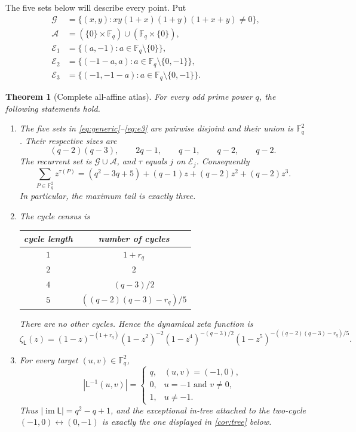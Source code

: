 \documentclass[10pt,a4paper]{amsart}
\newtheorem{theorem}{Theorem}[section]
\theoremstyle{definition}
\theoremstyle{remark}
\newcommand{\F}{\mathbb F}
\newcommand{\G}{\mathcal G}
\newcommand{\A}{\mathcal A}
\newcommand{\E}{\mathcal E}
\newcommand{\Lyn}{\mathsf L}
\newcommand{\im}{\operatorname{im}}
\begin{document}
The five sets below will describe every point.  Put
\begin{align}
 \G&=\{(x,y):xy(1+x)(1+y)(1+x+y)\ne0\},\label{eq:generic}\\
 \A&=(\{0\}\times\F_q)\cup(\F_q\times\{0\}),\label{eq:axes}\\
 \E_1&=\{(a,-1):a\in\F_q\setminus\{0\}\},\label{eq:e1}\\
 \E_2&=\{(-1-a,a):a\in\F_q\setminus\{0,-1\}\},\label{eq:e2}\\
 \E_3&=\{(-1,-1-a):a\in\F_q\setminus\{0,-1\}\}.\label{eq:e3}
\end{align}

\begin{theorem}[Complete all-affine atlas]\label{thm:main}
For every odd prime power $q$, the following statements hold.
\begin{enumerate}[label=\textup{(\roman*)}]
\item The five sets in \eqref{eq:generic}--\eqref{eq:e3} are pairwise
disjoint and their union is $\F_q^2$.  Their respective sizes are
\begin{equation}\label{eq:strata-sizes}
 (q-2)(q-3),\qquad 2q-1,\qquad q-1,\qquad q-2,\qquad q-2.
\end{equation}
The recurrent set is $\G\cup\A$, and $\tau$ equals $j$ on $\E_j$.
Consequently
\begin{equation}\label{eq:temporal}
 \sum_{P\in\F_q^2}z^{\tau(P)}
 =(q^2-3q+5)+(q-1)z+(q-2)z^2+(q-2)z^3.
\end{equation}
In particular, the maximum tail is exactly three.
\item The cycle census is
\begin{center}
\begin{tabular}{@{}cc@{}}
\toprule
cycle length & number of cycles\\
\midrule
$1$ & $1+r_q$\\
$2$ & $2$\\
$4$ & $(q-3)/2$\\
$5$ & $((q-2)(q-3)-r_q)/5$\\
\bottomrule
\end{tabular}
\end{center}
There are no other cycles.  Hence the dynamical zeta function is
\begin{equation}\label{eq:zeta}
 \zeta_{\Lyn}(z)=
 (1-z)^{-(1+r_q)}(1-z^2)^{-2}
 (1-z^4)^{-(q-3)/2}
 (1-z^5)^{-((q-2)(q-3)-r_q)/5}.
\end{equation}
\item For every target $(u,v)\in\F_q^2$,
\begin{equation}\label{eq:fibre-law}
 |\Lyn^{-1}(u,v)|=
 \begin{cases}
 q,&(u,v)=(-1,0),\\
 0,&u=-1\text{ and }v\ne0,\\
 1,&u\ne-1.
 \end{cases}
\end{equation}
Thus $|\im\Lyn|=q^2-q+1$, and the exceptional in-tree attached to the
two-cycle $(-1,0)\leftrightarrow(0,-1)$ is exactly the one displayed in
\cref{cor:tree} below.
\end{enumerate}
\end{theorem}
\end{document}

